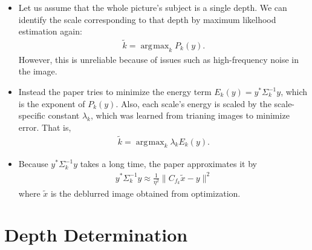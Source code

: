 \documentclass[10pt]{article}
\DeclareMathOperator*{\argmax}{\arg\!\max}
\begin{document}
\begin{itemize}
  \item Let us assume that the whole picture's subject is a single depth. We can identify the scale corresponding to that depth by maximum likelhood estimation again:
  \begin{align*}
    \tilde{k} = \argmax_k P_k(y).
  \end{align*}
  However, this is unreliable because of issues such as high-frequency noise in the image.
  
  \item Instead the paper tries to minimize the energy term $E_k(y) = y^* \Sigma_k^{-1} y$, which is the exponent of $P_k(y)$. Also, each scale's energy is scaled by the scale-specific constant $\lambda_k$, which was learned from trianing images to minimize error. That is,
  \begin{align*}
    \tilde{k} = \argmax_k \lambda_k E_k(y).
  \end{align*}
  
  \item Because $y^* \Sigma_k^{-1} y$ takes a long time, the paper approximates it by
  \begin{align*}
    y^*\Sigma_k^{-1} y \approx \frac{1}{\eta^2} \| C_{f_k}\tilde{x} - y \|^2 
  \end{align*}
  where $\tilde{x}$ is the deblurred image obtained from optimization.
\end{itemize}

\section{Depth Determination}\label{sec:depth_determination} %
\end{document}
